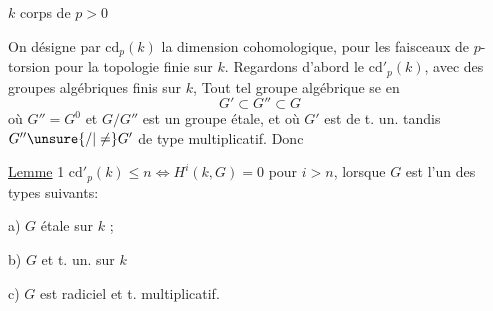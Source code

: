 $k$ corps de  $p>0$

On désigne par $\mathrm{cd}_p(k)$ la dimension cohomologique,
 pour les faisceaux de $p$-torsion pour la
topologie finie   sur $k$. Regardons d'abord
le $\mathrm{cd}'_p(k)$,  avec des groupes algébriques
 finis sur $k$,  Tout tel groupe algébrique se 
en
\[
G'\subset G''\subset G
\]
où $G''=G^0$ et $G/G''$ est un groupe
étale, et où $G'$ est  de t. un. tandis
$G''\unsure{/|\ne}G'$  de type multiplicatif. Donc

\uline{Lemme} 1 $\mathrm{cd}'_p(k)\leq n\Longleftrightarrow H^i(k,G)=0$ pour $i>n$,
lorsque $G$ est  l'un des types suivants:

a) $G$ étale sur $k$ ; 

b) $G$  et t. un. sur $k$

c) $G$ est radiciel et t. multiplicatif.


